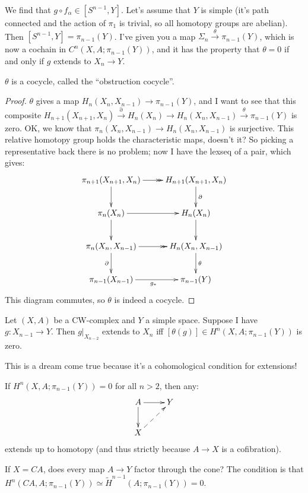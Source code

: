 We find that $g\circ f_\alpha\in [S^{n-1},Y]$. Let's assume that $Y$ is simple (it's path connected and the action of $\pi_1$ is trivial, so all homotopy groups are abelian). Then $[S^{n-1},Y] = \pi_{n-1}(Y)$. I've given you a map $\Sigma_n\xrightarrow{\theta}\pi_{n-1}(Y)$, which is now a cochain in $C^n(X,A;\pi_{n-1}(Y))$, and it has the property that $\theta = 0$ if and only if $g$ extends to $X_n\to Y$.
\begin{prop}
    $\theta$ is a cocycle, called the ``obstruction cocycle''.
\end{prop}
\begin{proof}
    $\theta$ gives a map $H_n(X_n,X_{n-1})\to \pi_{n-1}(Y)$, and I want to see that this composite $H_{n+1}(X_{n+1},X_n)\xrightarrow{\partial}H_n(X_n)\to H_n(X_n,X_{n-1})\xrightarrow{\theta}\pi_{n-1}(Y)$ is zero. OK, we know that $\pi_n(X_n,X_{n-1})\to H_n(X_n,X_{n-1})$ is surjective. This relative homotopy group holds the characteristic maps, doesn't it? So picking a representative back there is no problem; now I have the lexseq of a pair, which gives:
    \begin{equation*}
	\xymatrix{
	    \pi_{n+1}(X_{n+1},X_n)\ar[d]\ar@{->>}[r] & H_{n+1}(X_{n+1},X_n)\ar[d]^\partial\\
	    \pi_n(X_n)\ar[r]\ar[d] & H_n(X_n)\ar[d]\\
	    \pi_n(X_n,X_{n-1})\ar@{->>}[r] \ar[d]_\partial & H_n(X_n,X_{n-1})\ar[d]^\theta\\
	    \pi_{n-1}(X_{n-1})\ar[r]_{g_\ast} & \pi_{n-1}(Y)
	    }
    \end{equation*}
    This diagram commutes, so $\theta$ is indeed a cocycle.
\end{proof}
\begin{theorem}
    Let $(X,A)$ be a CW-complex and $Y$ a simple space. Suppose I have $g:X_{n-1}\to Y$. Then $g|_{X_{n-2}}$ extends to $X_n$ iff $[\theta(g)]\in H^n(X,A;\pi_{n-1}(Y))$ is zero.
\end{theorem}
This is a dream come true because it's a cohomological condition for extensions!
\begin{corollary}
    If $H^n(X,A;\pi_{n-1}(Y)) = 0$ for all $n>2$, then any:
    \begin{equation*}
	\xymatrix{
	A\ar[r]\ar[d] & Y\\
	X\ar@{-->}[ur] & 
	}
    \end{equation*}
    extends up to homotopy (and thus strictly because $A\to X$ is a cofibration).
\end{corollary}
\begin{example}
    If $X = CA$, does every map $A\to Y$ factor through the cone? The condition is that $H^n(CA,A;\pi_{n-1}(Y)) \simeq \widetilde{H}^{n-1}(A;\pi_{n-1}(Y)) = 0$.
\end{example}
